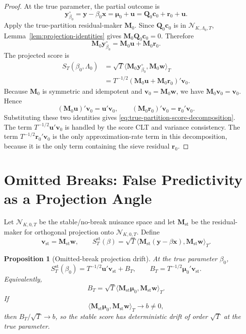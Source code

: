 \documentclass[12pt]{article}
\numberwithin{equation}{section}
\newtheorem{proposition}{Proposition}
\theoremstyle{definition}
\newcommand{\N}{\mathcal N}
\newcommand{\innerT}[2]{\langle #1,#2\rangle_T}
\begin{document}
\begin{proof}
At the true parameter, the partial outcome is
\[
    \bm y_{\beta_0}^\circ
    =\bm y-\beta_0\bm x
    =\bm\mu_0+\bm u
    =\bm Q_0\bm c_0+\bm r_0+\bm u.
\]
Apply the true-partition residual-maker \(\bm M_0\). Since \(\bm Q_0\bm c_0\) is
in \(\N_{K,\Lambda_0,T}\), Lemma~\ref{lem:projection-identities} gives
\(\bm M_0\bm Q_0\bm c_0=0\). Therefore
\[
    \bm M_0\bm y_{\beta_0}^\circ
    =\bm M_0\bm u+\bm M_0\bm r_0.
\]
The projected score is
\[
\begin{aligned}
    S_T(\beta_0,\Lambda_0)
    &=\sqrt T\innerT{\bm M_0\bm y_{\beta_0}^\circ}{\bm M_0\bm w} \\
    &=T^{-1/2}(\bm M_0\bm u+\bm M_0\bm r_0)'\bm v_0.
\end{aligned}
\]
Because \(\bm M_0\) is symmetric and idempotent and \(\bm v_0=\bm M_0\bm w\),
we have \(\bm M_0\bm v_0=\bm v_0\). Hence
\[
    (\bm M_0\bm u)'\bm v_0=\bm u'\bm v_0,
    \qquad
    (\bm M_0\bm r_0)'\bm v_0=\bm r_0'\bm v_0.
\]
Substituting these two identities gives
\eqref{eq:true-partition-score-decomposition}. The term
\(T^{-1/2}\bm u'\bm v_0\) is handled by the score CLT and variance consistency.
The term \(T^{-1/2}\bm r_0'\bm v_0\) is the only approximation-rate term in this
decomposition, because it is the only term containing the sieve residual
\(\bm r_0\).
\end{proof}
\section{Omitted Breaks: False Predictivity as a Projection Angle}

Let \(\N_{K,0,T}\) be the stable/no-break nuisance space and let
\(\bm M_{\mathrm{st}}\) be the residual-maker for orthogonal projection onto
\(\N_{K,0,T}\). Define
\[
    \bm v_{\mathrm{st}}=\bm M_{\mathrm{st}}\bm w,
    \qquad
    S_T^{\mathrm{st}}(\beta)
    =\sqrt T\innerT{\bm M_{\mathrm{st}}(\bm y-\beta\bm x)}
                         {\bm M_{\mathrm{st}}\bm w}.
\]

\begin{proposition}[Omitted-break projection drift]
\label{prop:omitted-break-projection-drift}
At the true parameter \(\beta_0\),
\begin{equation}
    S_T^{\mathrm{st}}(\beta_0)
    =
    T^{-1/2}\bm u'\bm v_{\mathrm{st}}
    +B_T,
    \qquad
    B_T=T^{-1/2}\bm\mu_0'\bm v_{\mathrm{st}}.
    \label{eq:stable-score-drift-decomposition}
\end{equation}
Equivalently,
\begin{equation}
    B_T
    =
    \sqrt T
    \innerT{\bm M_{\mathrm{st}}\bm\mu_0}
           {\bm M_{\mathrm{st}}\bm w}.
    \label{eq:stable-score-drift-inner-product}
\end{equation}
If
\[
    \innerT{\bm M_{\mathrm{st}}\bm\mu_0}
           {\bm M_{\mathrm{st}}\bm w}
    \to b\ne0,
\]
then \(B_T/\sqrt T\to b\), so the stable score has deterministic drift of
order \(\sqrt T\) at the true parameter.
\end{proposition}
\end{document}
